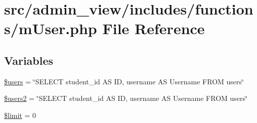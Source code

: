\hypertarget{mUser_8php}{\section{src/admin\-\_\-view/includes/functions/m\-User.php \-File \-Reference}
\label{mUser_8php}
}
\subsection*{\-Variables}
\begin{DoxyCompactItemize}
\item 
\hyperlink{mUser_8php_a28005d22fa7ef2dfe215ad886b497d9c}{\$users} = \char`\"{}\-S\-E\-L\-E\-C\-T student\-\_\-id \-A\-S \-I\-D, username \-A\-S \-Username \-F\-R\-O\-M users\char`\"{}
\item 
\hyperlink{mUser_8php_a62dd122dbddde32a07c3f104eabb051f}{\$users2} = \char`\"{}\-S\-E\-L\-E\-C\-T student\-\_\-id \-A\-S \-I\-D, username \-A\-S \-Username \-F\-R\-O\-M users\char`\"{}
\item 
\hyperlink{mUser_8php_ae05862a0294251c88629b141b5ce329a}{\$limit} = 0
\end{DoxyCompactItemize}


